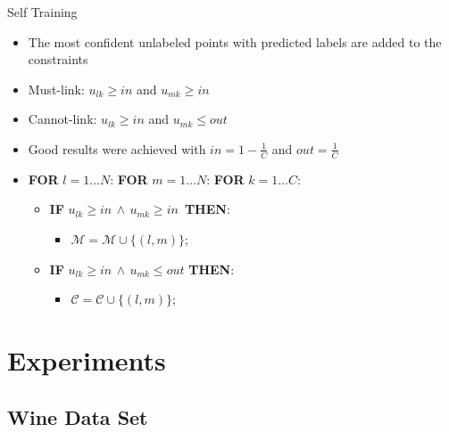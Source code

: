 \documentclass{beamer}
\begin{document}
\begin{frame}{Self Training}
	\begin{itemize}
		\item{The most confident unlabeled points with predicted labels are added to the constraints}
		\item{Must-link: $u_{lk} \geq in$ and $u_{mk} \geq in$}
		\item{Cannot-link: $u_{lk} \geq in$ and $u_{mk} \leq out$}
		\item{Good results were achieved with $in = 1 - \frac{1}{C}$ and $out = \frac{1}{C}$}
	\end{itemize}
	\begin{itemize}
		\item[]\textbf{FOR} $l = 1 \ldots N$: \textbf{FOR} $m = 1 \ldots N$: \textbf{FOR} $k = 1 \ldots C$:
	\begin{itemize}
		\item[]\textbf{IF} $u_{lk} \geq in \, \land \, u_{mk} \geq in \,$ \textbf{THEN}:
			\begin{itemize}	
				\item[]$\mathcal{M} = \mathcal{M} \cup\{(l,m)\}$;
			\end{itemize}	
		\item[]\textbf{IF} $u_{lk} \geq in \, \land \, u_{mk} \leq out$ \textbf{THEN}: 
			\begin{itemize}	
				\item[]$\mathcal{C} = \mathcal{C} \cup\{(l,m)\}$;
			\end{itemize}
		\end{itemize}
	\end{itemize}
\end{frame}

\section{Experiments}

\subsection{Wine Data Set}
\end{document}
